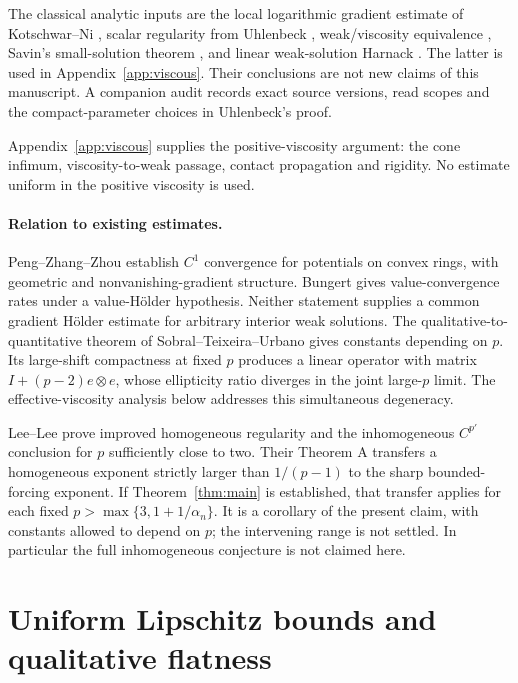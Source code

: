 \documentclass[11pt]{article}
\theoremstyle{remark}\newtheorem{remark}[theorem]{Remark}
\begin{document}
The classical analytic inputs are the local logarithmic gradient
estimate of Kotschwar--Ni \cite{KotschwarNi}, scalar regularity from
Uhlenbeck \cite{Uhlenbeck}, weak/viscosity equivalence
\cite{JulinJuutinen}, Savin's small-solution theorem \cite{Savin}, and
linear weak-solution Harnack \cite{Crescimbeni}. The latter is used
in Appendix~\ref{app:viscous}. Their conclusions are not new claims
of this manuscript. A companion audit records exact source versions,
read scopes and the compact-parameter choices in Uhlenbeck's proof.

Appendix~\ref{app:viscous} supplies the positive-viscosity argument:
the cone infimum, viscosity-to-weak passage, contact propagation and
rigidity. No estimate uniform in the positive viscosity is used.

\paragraph{Relation to existing estimates.}
Peng--Zhang--Zhou \cite[Theorem 1.1]{PengZhangZhou} establish
$C^1$ convergence for potentials on convex rings, with geometric
and nonvanishing-gradient structure. Bungert \cite[Theorem 1]{Bungert}
gives value-convergence rates under a value-Hölder hypothesis.
Neither statement supplies a common gradient Hölder estimate for
arbitrary interior weak solutions. The qualitative-to-quantitative
theorem of Sobral--Teixeira--Urbano
\cite[Theorem 1.1]{SobralTeixeiraUrbano} gives constants depending on
$p$. Its large-shift compactness at fixed $p$ produces a linear
operator with matrix $I+(p-2)e\otimes e$, whose ellipticity ratio
diverges in the joint large-$p$ limit. The effective-viscosity
analysis below addresses this simultaneous degeneracy.

Lee--Lee \cite{LeeLee} prove improved homogeneous regularity and the
inhomogeneous $C^{p'}$ conclusion for $p$ sufficiently close to two.
Their Theorem A transfers a homogeneous exponent strictly larger than
$1/(p-1)$ to the sharp bounded-forcing exponent. If
Theorem~\ref{thm:main} is established, that transfer applies for each
fixed $p>\max\{3,1+1/\alpha_n\}$. It is a corollary of the present
claim, with constants allowed to depend on $p$; the intervening range
is not settled. In particular the full inhomogeneous conjecture is
not claimed here.

\section{Uniform Lipschitz bounds and qualitative flatness}
\end{document}
